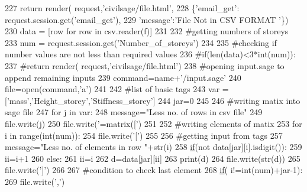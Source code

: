 \begin{DoxyCode}
227             \textcolor{keywordflow}{return} render( request,\textcolor{stringliteral}{'civilsage/file.html'},
228             \{\textcolor{stringliteral}{'email\_get'}: request.session.get(\textcolor{stringliteral}{'email\_get'}),
229             \textcolor{stringliteral}{'message'}:\textcolor{stringliteral}{'File Not in CSV FORMAT '}\})
230         data = [row \textcolor{keywordflow}{for} row \textcolor{keywordflow}{in} csv.reader(f)]
231 
232         \textcolor{comment}{#getting numbers of storeys}
233         num = request.session.get(\textcolor{stringliteral}{'Number\_of\_storeys'})
234 
235         \textcolor{comment}{#checking if number values are not less than required values}
236         \textcolor{comment}{#if(len(data)<3*int(num)):}
237             \textcolor{comment}{#return render( request,'civilsage/file.html')}
238         \textcolor{comment}{#opening input.sage to append remaining inputs}
239         command=name+\textcolor{stringliteral}{'/input.sage'}
240         file=open(command,\textcolor{stringliteral}{'a'})
241 
242         \textcolor{comment}{#list of basic tags}
243         var = [\textcolor{stringliteral}{'mass'},\textcolor{stringliteral}{'Height\_storey'},\textcolor{stringliteral}{'Stiffness\_storey'}]
244         jar=0
245 
246         \textcolor{comment}{#writing matix into sage file}
247         \textcolor{keywordflow}{for} j \textcolor{keywordflow}{in} var:
248             message=\textcolor{stringliteral}{"Less no. of rows in csv file"}
249             file.write(j)
250             file.write(\textcolor{stringliteral}{'=matrix(['})
251 
252             \textcolor{comment}{#writing elements of matix}
253             \textcolor{keywordflow}{for} i \textcolor{keywordflow}{in} range(int(num)):
254                 file.write(\textcolor{stringliteral}{'['})
255 
256                 \textcolor{comment}{#getting input from tags}
257                 message=\textcolor{stringliteral}{"Less no. of elements in row "}+str(i)
258                 \hyperlink{bootstrap_8min_8js_ac2d69f5011896c6ed4a54e0dd36f6334}{if}(\textcolor{keywordflow}{not} data[jar][i].isdigit()):
259                     ii=i+1
260                 \textcolor{keywordflow}{else}:
261                     ii=i
262                 d=data[jar][ii]
263                 print(d)
264                 file.write(str(d))
265                 file.write(\textcolor{stringliteral}{']'})
266 
267                 \textcolor{comment}{#condition to check last element}
268                 \hyperlink{bootstrap_8min_8js_ac2d69f5011896c6ed4a54e0dd36f6334}{if}( i!=int(num)+jar-1):
269                     file.write(\textcolor{stringliteral}{','})

\end{DoxyCode}
